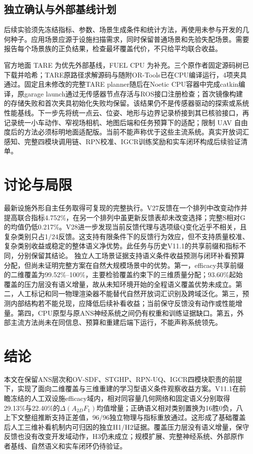 \documentclass[11pt,a4paper]{article}
\begin{document}
\subsection{独立确认与外部基线计划}

后续实验须先冻结指标、参数、场景生成条件和统计方法，再使用未参与开发的几何种子。应用场景应源于设施扫描需求，同时保留普通场景和先验失配场景。需要报告每个场景族的正负结果，检查最坏覆盖代价，不只给平均联合收益。

官方地面 TARE 为优先外部基线，FUEL CPU 为补充。三个原作者固定源码树已下载并哈希；TARE原路径求解源码与随附OR-Tools已在CPU编译运行，4项夹具通过。固定且未修改的完整TARE planner随后在Noetic CPU容器中完成catkin编译，原garage launch通过无传感器节点存活与ROS接口注册检查；首次镜像构建的存储失败和首次夹具初始化失败均保留。该结果仍不是传感器驱动的探索或系统性能基线。下一步先将统一点云、位姿、地形与边界记录桥接到其已核验接口，再记录统一小车动作、窄视场相机、地图后端和任务预算下的适配；限制 UAV 自由度后的方法必须标明地面适配版。当前不能声称优于这些主流系统。真实开放词汇感知、完整四模块调用链、RPN校准、IGCR训练奖励和实车闭环构成后续验证清单。

\section{讨论与局限}
最新设施外形自主任务取得可复现的完整执行。V27反馈在一个排列中改变动作并提高联合指标4.752\%，在另一个排列中虽更新反馈表却未改变选择；完整S相对G的均值仍低0.217\%。V28进一步发现当前反馈代理与选项级Q变化近乎不相关，且复杂类别只占1/24反馈。这支持有限条件下的反馈行为效应，但不支持质量校准、复杂类别收益或稳定的整体语义净优势。此任务与历史V11.1的共享前缀和指标不同，分别保留其结论。
独立人工场景证据支持语义条件收益预测与闭环补看预算分配，但尚未证明完整方案在自然大规模场景中的优势。第一，efficacy共享前缀的二维覆盖为99.52\%--100\%，主要检验覆盖约束下的三维质量分配；93.60\%起始覆盖的压力层没有语义增量，故从未知环境开始的全程语义覆盖优势未成立。第二，人工标记和同一物理渲染器不能替代自然开放词汇识别及跨域泛化。第三，预测内部结构若不能兑现，应降低后续补看收益；当前保守反馈没有动作或性能增量。第四，CPU原型与原ANS神经系统之间仍有权重和训练证据缺口。第五，外部主流方法尚未在同信息、预算和重建后端下运行，不能声称系统领先。

\section{结论}
本文在保留ANS层次和OV-SDF、STGHP、RPN-UQ、IGCR四模块职责的前提下，实现了面向二维覆盖与三维重建的学习型语义条件观察收益方案。V11.1在前瞻冻结的人工双设施efficacy域内，相对同容量几何网络和固定语义分别取得29.13\%与22.40\%的$\Delta(A_{2D}F_1)$均值增量；正确语义相对类别置换为16胜0负，八上下文整组推断支持正差值，96/96独立物理与指标重放通过。这形成了基础覆盖后人工三维补看机制内可归因的独立H1/H2证据。覆盖压力层没有语义增量，保守反馈也没有改变开发域动作，H3仍未成立；规模扩展、完整神经系统、外部原作者基线、自然语义和实车闭环仍待验证。
\end{document}
